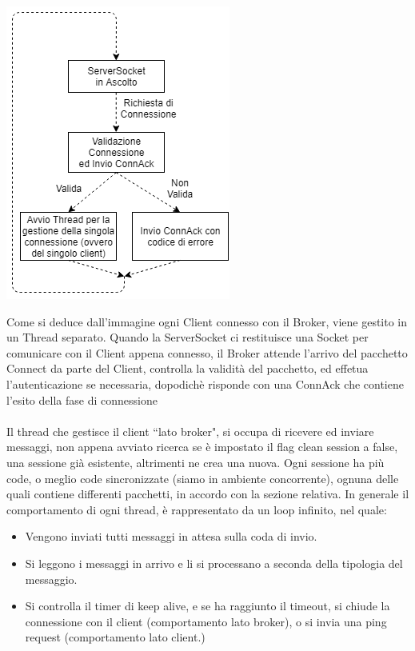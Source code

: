 \documentclass{article}
\begin{document}
\begin{center}
	\includegraphics[scale=0.6]{immagini/serversocket.png}
\end{center}
Come si deduce dall'immagine ogni Client connesso con il Broker, viene gestito in un Thread separato. Quando la ServerSocket ci restituisce una Socket per comunicare con il Client appena connesso, il Broker attende l'arrivo del pacchetto Connect da parte del Client, controlla la validità del pacchetto, ed effetua l'autenticazione se necessaria, dopodichè risponde con una ConnAck che contiene l'esito della fase di connessione\\\\
Il thread che gestisce il client ``lato broker", si occupa di ricevere ed inviare messaggi, non appena avviato ricerca se è impostato il flag clean session a false, una sessione già esistente, altrimenti ne crea una nuova. Ogni sessione ha più code, o meglio code sincronizzate (siamo in ambiente concorrente), ognuna delle quali contiene differenti pacchetti, in accordo con la sezione relativa. In generale il comportamento di ogni thread, è rappresentato da un loop infinito, nel quale:
\begin{itemize}
	\item Vengono inviati tutti messaggi in attesa sulla coda di invio.
	\item Si leggono i messaggi in arrivo e li si processano a seconda della tipologia del messaggio.
	\item Si controlla il timer di keep alive, e se ha raggiunto il timeout, si chiude la connessione con il client (comportamento lato broker), o si invia una ping request (comportamento lato client.)
\end{itemize}
\end{document}
